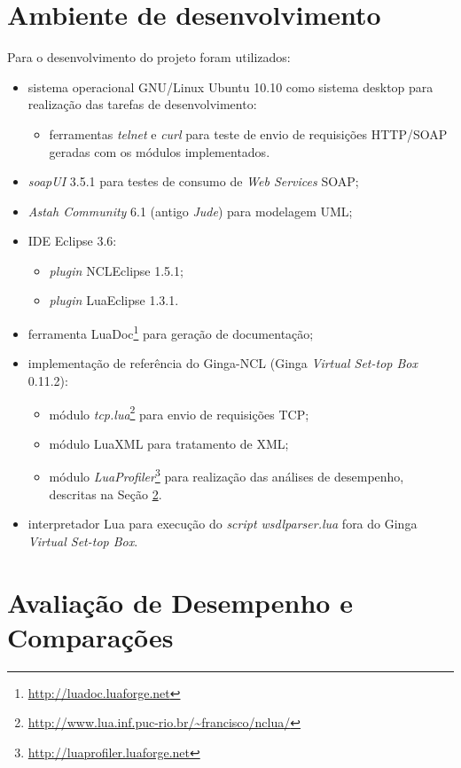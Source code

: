 \section{Ambiente de desenvolvimento}

Para o desenvolvimento do projeto foram utilizados:
\begin{itemize}
	\item sistema operacional GNU/Linux Ubuntu 10.10 como sistema desktop para realização das tarefas de desenvolvimento:
  \begin{itemize}
  		\item ferramentas \textit{telnet} e \textit{curl} para teste de envio de requisições HTTP/SOAP geradas com os módulos implementados.
  	\end{itemize}	
  \item \textit{soapUI} 3.5.1 para testes de consumo de \textit{Web Services} SOAP;
  \item \textit{Astah Community} 6.1 (antigo \textit{Jude}) para modelagem UML;
	\item IDE Eclipse 3.6:
	\begin{itemize}
		\item \textit{plugin} NCLEclipse 1.5.1;
		\item \textit{plugin} LuaEclipse 1.3.1.
	\end{itemize}
	\item ferramenta LuaDoc\footnote{\url{http://luadoc.luaforge.net}} para geração de documentação;
	\item implementação de referência do Ginga-NCL (Ginga \textit{Virtual Set-top Box} 0.11.2):
	\begin{itemize}
		\item módulo \textit{tcp.lua}\footnote{\url{http://www.lua.inf.puc-rio.br/~francisco/nclua/}} para envio de requisições TCP;
		\item módulo LuaXML para tratamento de XML;
		\item módulo \textit{LuaProfiler}\footnote{\url{http://luaprofiler.luaforge.net}}
	para realização das análises de desempenho, descritas na Seção \ref{sec:analise}.
	\end{itemize}
	\item interpretador Lua para execução do \textit{script wsdlparser.lua} fora do Ginga \textit{Virtual Set-top Box}.
\end{itemize}

\section{Avaliação de Desempenho e Comparações} \label{sec:analise}

